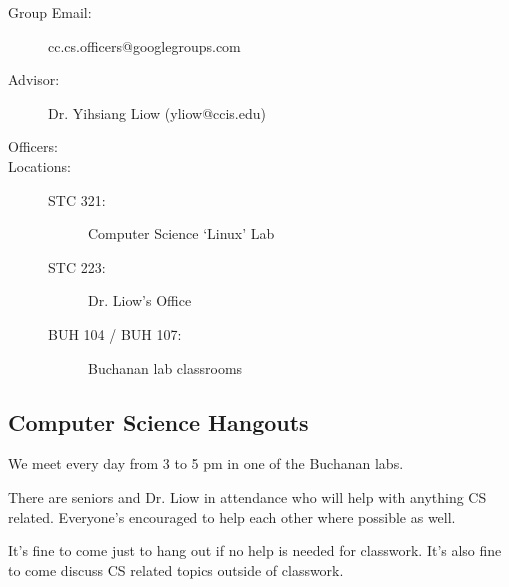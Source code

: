 \begin{description}
\item[{Group Email:}] cc.cs.officers@googlegroups.com
\item[{Advisor:}] Dr. Yihsiang Liow (yliow@ccis.edu)
\item[{Officers:}] \hspace*{1em}
\item[{Locations:}] \hspace*{1em}
\begin{description}
\item[{STC 321:}] Computer Science \textquoteleft{}Linux\textquoteright{} Lab
\item[{STC 223:}] Dr. Liow's Office
\item[{BUH 104 / BUH 107:}] Buchanan lab classrooms
\end{description}
\end{description}

\newpage

\subsection{Computer Science Hangouts}
\label{sec-2-4}

We meet every day from 3 to 5 pm in one of the Buchanan labs.

There are seniors and Dr. Liow in attendance who will help with anything CS
related. Everyone's encouraged to help each other where possible as well.

It's fine to come just to hang out if no help is needed for classwork. It's
also fine to come discuss CS related topics outside of classwork.

